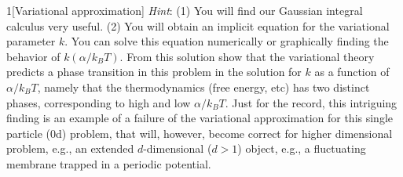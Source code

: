 \documentclass[12pt]{article}
\begin{document}
\begin{problem}{1}[Variational approximation]
\textit{Hint}: (1) You will find our Gaussian integral calculus very useful. (2)
You will obtain an implicit equation for the variational parameter $k$. You can
solve this equation numerically or graphically finding the behavior of
$k(\alpha/k_BT)$. From this solution show that the variational theory predicts a
phase transition in this problem in the solution for $k$ as a function of
$\alpha/k_BT$, namely that the thermodynamics (free energy, etc) has two
distinct phases, corresponding to high and low $\alpha/k_BT$. Just for the
record, this intriguing finding is an example of a failure of the variational
approximation for this single particle (0d) problem, that will, however, become
correct for higher dimensional problem, e.g., an extended $d$-dimensional
($d>1$) object, e.g., a fluctuating membrane trapped in a periodic potential.
\end{problem}
\newpage
\end{document}
